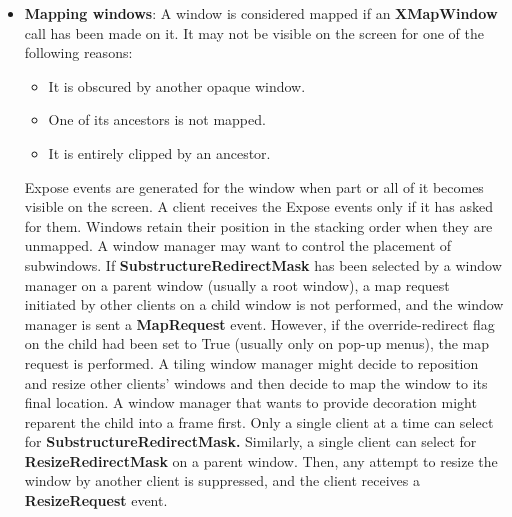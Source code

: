 \documentclass{report}
\begin{document}
\begin{itemize}
            \bigbreak \noindent 
            If two sibling windows overlap, the one higher in the stack obscures the lower one.
            \bigbreak \noindent 
            Top-level application windows are usually children of the root window. So the stacking order of top-level windows is the stacking order of the root window’s children.
            \bigbreak \noindent 
            A window manager manipulates this order constantly. When you focus a window, open a menu, raise a dialog, or move a window to the front, the window manager changes the stacking order.
        \item \textbf{Mapping windows}: A window is considered mapped if an \textbf{XMapWindow} call has been made on it. It may not be visible on the screen for one of the following reasons:
            \begin{itemize}
                \item It is obscured by another opaque window.
                \item One of its ancestors is not mapped.
                \item It is entirely clipped by an ancestor.
            \end{itemize}
            Expose events are generated for the window when part or all of it becomes visible on the screen. A client receives the Expose events only if it has asked for them. Windows retain their position in the stacking order when they are unmapped.
            \bigbreak \noindent 
            A window manager may want to control the placement of subwindows. If \textbf{SubstructureRedirectMask} has been selected by a window manager on a parent window (usually a root window), a map request initiated by other clients on a child window is not performed, and the window manager is sent a \textbf{MapRequest} event. However, if the override-redirect flag on the child had been set to True (usually only on pop-up menus), the map request is performed.
            \bigbreak \noindent 
            A tiling window manager might decide to reposition and resize other clients’ windows and then decide to map the window to its final location. A window manager that wants to provide decoration might reparent the child into a frame first. Only a single client at a time can select for \textbf{SubstructureRedirectMask.}
            \bigbreak \noindent 
            Similarly, a single client can select for \textbf{ResizeRedirectMask} on a parent window. Then, any attempt to resize the window by another client is suppressed, and the client receives a \textbf{ResizeRequest} event.

\end{itemize}
\end{document}
